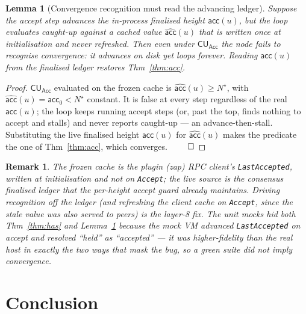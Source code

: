 \documentclass[11pt]{article}
\newtheorem{lemma}[theorem]{Lemma}
\newtheorem{remark}{Remark}
\begin{document}
\begin{lemma}[Convergence recognition must read the advancing ledger]\label{lem:frozen}
Suppose the accept step advances the in-process finalised height $\mathsf{acc}(u)$, but the loop
evaluates caught-up against a cached value $\widehat{\mathsf{acc}}(u)$ that is written once at
initialisation and never refreshed. Then even under $\mathsf{CU}_{\mathsf{Acc}}$ the node fails to
recognise convergence: it advances on disk yet loops forever. Reading $\mathsf{acc}(u)$ from the
finalised ledger restores Thm~\ref{thm:acc}.
\end{lemma}
\begin{proof}
$\mathsf{CU}_{\mathsf{Acc}}$ evaluated on the frozen cache is
$\widehat{\mathsf{acc}}(u)\ge N^\star$, with $\widehat{\mathsf{acc}}(u)=\mathsf{acc}_0<N^\star$
constant. It is false at every step regardless of the real $\mathsf{acc}(u)$; the loop keeps running
accept steps (or, past the top, finds nothing to accept and stalls) and never reports caught-up ---
an advance-then-stall. Substituting the live finalised height $\mathsf{acc}(u)$ for
$\widehat{\mathsf{acc}}(u)$ makes the predicate the one of Thm~\ref{thm:acc}, which converges. $\qed$
\end{proof}

\begin{remark}
The frozen cache is the plugin (zap) RPC client's \texttt{LastAccepted}, written at
initialisation and not on \texttt{Accept}; the live source is the consensus finalised ledger that
the per-height accept guard already maintains. Driving recognition off the ledger (and refreshing
the client cache on \texttt{Accept}, since the stale value was also served to peers) is the layer-8
fix. The unit mocks hid both Thm~\ref{thm:has} and Lemma~\ref{lem:frozen} because the mock VM
advanced \texttt{LastAccepted} on accept and resolved ``held'' as ``accepted'' --- it was
\emph{higher-fidelity} than the real host in exactly the two ways that mask the bug, so a green
suite did not imply convergence.
\end{remark}

\section{Conclusion}
\end{document}
